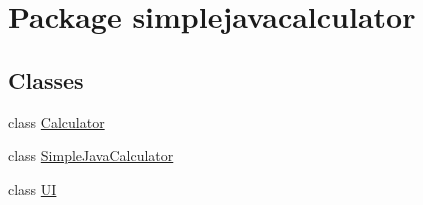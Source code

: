 \hypertarget{namespacesimplejavacalculator}{}\section{Package simplejavacalculator}
\label{namespacesimplejavacalculator}
\subsection*{Classes}
\begin{DoxyCompactItemize}
\item 
class \mbox{\hyperlink{classsimplejavacalculator_1_1_calculator}{Calculator}}
\item 
class \mbox{\hyperlink{classsimplejavacalculator_1_1_simple_java_calculator}{Simple\+Java\+Calculator}}
\item 
class \mbox{\hyperlink{classsimplejavacalculator_1_1_u_i}{UI}}
\end{DoxyCompactItemize}
